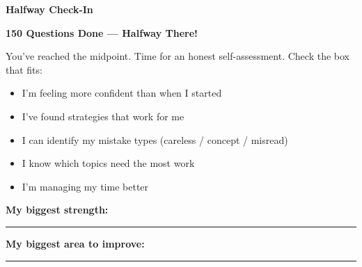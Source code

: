 \clearpage
\thispagestyle{empty}
{\sffamily

\begin{center}
{\fontsize{22}{26}\selectfont\bfseries\color{funTeal} \faMapSigns\hspace{3mm}Halfway Check-In\hspace{3mm}\faMapSigns}

\vspace{2mm}
{\color{funGray}\hrulefill}
\end{center}

\vspace{3mm}

\begin{tcolorbox}[
    enhanced,
    colback=funTealLight,
    colframe=funTeal!50,
    arc=10pt,
    boxrule=1.5pt,
    left=6mm, right=6mm, top=5mm, bottom=5mm,
]
{\large\bfseries\color{funTealDark} \faFlagCheckered\hspace{2mm}150 Questions Done --- Halfway There!}

\vspace{2mm}

You've reached the midpoint. Time for an honest self-assessment. Check the box that fits:

\vspace{3mm}

\begin{itemize}[leftmargin=6mm, itemsep=4pt]
    \item[$\square$] I'm feeling more confident than when I started
    \item[$\square$] I've found strategies that work for me
    \item[$\square$] I can identify my mistake types (careless / concept / misread)
    \item[$\square$] I know which topics need the most work
    \item[$\square$] I'm managing my time better
\end{itemize}

\vspace{2mm}

\textbf{My biggest strength:} \rule[-2pt]{6cm}{0.5pt}

\vspace{2mm}

\textbf{My biggest area to improve:} \rule[-2pt]{5cm}{0.5pt}
\end{tcolorbox}

\vspace{3mm}

}
